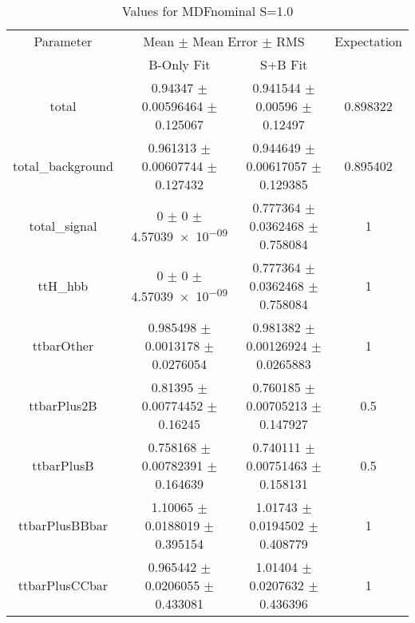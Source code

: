 \begin{table}
\centering
\caption{Values for MDFnominal S=1.0}
\begin{tabular}{cccc}
\toprule
Parameter & \multicolumn{2}{c}{Mean $\pm$ Mean Error $\pm$ RMS} & Expectation\\
 & B-Only Fit & S+B Fit & \\
\midrule
total & \num{0.94347} $\pm$ \num{0.00596464} $\pm$ \num{0.125067} & \num{0.941544} $\pm$ \num{0.00596} $\pm$ \num{0.12497} & \num{0.898322}\\
total\_background & \num{0.961313} $\pm$ \num{0.00607744} $\pm$ \num{0.127432} & \num{0.944649} $\pm$ \num{0.00617057} $\pm$ \num{0.129385} & \num{0.895402}\\
total\_signal & \num{0} $\pm$ \num{0} $\pm$ \num{4.57039e-09} & \num{0.777364} $\pm$ \num{0.0362468} $\pm$ \num{0.758084} & \num{1}\\
ttH\_hbb & \num{0} $\pm$ \num{0} $\pm$ \num{4.57039e-09} & \num{0.777364} $\pm$ \num{0.0362468} $\pm$ \num{0.758084} & \num{1}\\
ttbarOther & \num{0.985498} $\pm$ \num{0.0013178} $\pm$ \num{0.0276054} & \num{0.981382} $\pm$ \num{0.00126924} $\pm$ \num{0.0265883} & \num{1}\\
ttbarPlus2B & \num{0.81395} $\pm$ \num{0.00774452} $\pm$ \num{0.16245} & \num{0.760185} $\pm$ \num{0.00705213} $\pm$ \num{0.147927} & \num{0.5}\\
ttbarPlusB & \num{0.758168} $\pm$ \num{0.00782391} $\pm$ \num{0.164639} & \num{0.740111} $\pm$ \num{0.00751463} $\pm$ \num{0.158131} & \num{0.5}\\
ttbarPlusBBbar & \num{1.10065} $\pm$ \num{0.0188019} $\pm$ \num{0.395154} & \num{1.01743} $\pm$ \num{0.0194502} $\pm$ \num{0.408779} & \num{1}\\
ttbarPlusCCbar & \num{0.965442} $\pm$ \num{0.0206055} $\pm$ \num{0.433081} & \num{1.01404} $\pm$ \num{0.0207632} $\pm$ \num{0.436396} & \num{1}\\
\bottomrule
\end{tabular}
\end{table}